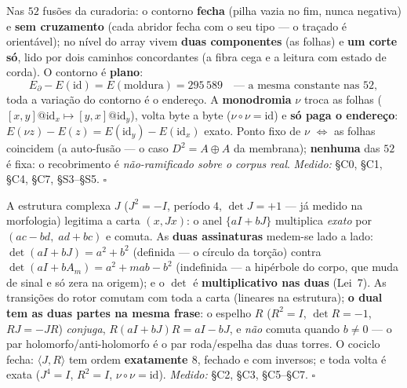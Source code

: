 \documentclass[livro.tex]{subfiles}
\begin{document}
\begin{teorema}\label{thm:contorno-plano}
Nas $52$ fusões da curadoria: o contorno \textbf{fecha} (pilha vazia no
fim, nunca negativa) e \textbf{sem cruzamento} (cada abridor fecha com o
seu tipo --- o traçado é orientável); no nível do array vivem
\textbf{duas componentes} (as folhas) e \textbf{um corte só}, lido por
dois caminhos concordantes (a fibra cega e a leitura com estado de
corda). O contorno é \textbf{plano}:
\[
E_{\partial}-E(\mathrm{id})=E(\text{moldura})=295\,589
\quad\text{--- a mesma constante nas } 52,
\]
toda a variação do contorno é o endereço. A \textbf{monodromia} $\nu$
troca as folhas ($[x,y]@\mathrm{id}_{x}\mapsto[y,x]@\mathrm{id}_{y}$),
volta byte a byte ($\nu\circ\nu=\mathrm{id}$) e \textbf{só paga o
endereço}: $E(\nu z)-E(z)=E(\mathrm{id}_{y})-E(\mathrm{id}_{x})$ exato.
Ponto fixo de $\nu$ $\iff$ as folhas coincidem (a auto-fusão --- o caso
$D^{2}=A\oplus A$ da membrana); \textbf{nenhuma} das $52$ é fixa: o
recobrimento é \emph{não-ramificado sobre o corpus real}.
\emph{Medido:} \S C0, \S C1, \S C4, \S C7, \S S3--\S S5. $\square$
\end{teorema}

\begin{teorema}\label{thm:cartas}
A estrutura complexa $J$ ($J^{2}=-I$, período $4$, $\det J=+1$ --- já medido na
morfologia) legitima a carta $(x,Jx)$: o anel $\{aI+bJ\}$ multiplica
\emph{exato} por $(ac-bd,\;ad+bc)$ e comuta. As \textbf{duas
assinaturas} medem-se lado a lado: $\det(aI+bJ)=a^{2}+b^{2}$
(definida --- o círculo da torção) contra
$\det(aI+bA_{m})=a^{2}+mab-b^{2}$ (indefinida --- a hipérbole do corpo,
que muda de sinal e só zera na origem); e o $\det$ é
\textbf{multiplicativo nas duas} (Lei~7). As transições do rotor
comutam com toda a carta (lineares na estrutura); \textbf{o dual tem as
duas partes na mesma frase}: o espelho $R$ ($R^{2}=I$, $\det R=-1$,
$RJ=-JR$) \emph{conjuga}, $R(aI+bJ)R=aI-bJ$, e \emph{não} comuta quando
$b\neq0$ --- o par holomorfo/anti-holomorfo é o par roda/espelha das
duas torres. O cociclo fecha: $\langle J,R\rangle$ tem ordem
\textbf{exatamente $8$}, fechado e com inversos; e toda volta é exata
($J^{4}=I$, $R^{2}=I$, $\nu\circ\nu=\mathrm{id}$).
\emph{Medido:} \S C2, \S C3, \S C5--\S C7. $\square$
\end{teorema}
\end{document}
